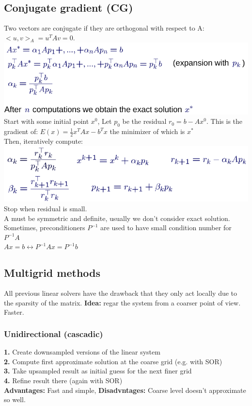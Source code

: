 \documentclass{article}
\begin{document}
\subsection{Conjugate gradient (CG)}
Two vectors are conjugate if they are orthogonal with respect to A: $<u,v>_A=u^TAv=0$.\\
\includegraphics[scale=0.3]{34.png}\\
Start with some initial point $x^0$, Let $p_0$ be the residual $r_0=b-Ax^0$. This is the gradient of: $E(x)=\frac{1}{2}x^TAx-b^Tx$ the minimizer of which is $x^*$\\
Then, iteratively compute:\\
\includegraphics[scale=0.3]{35.png}\\
Stop when residual is small.\\
A must be symmetric and definite, usually we don't consider exact solution. Sometimes, preconditioners $P^{-1}$ are used to have small condition number for $P^{-1}A$\\
$Ax = b \leftrightarrow P^{-1}Ax=P^{-1}b$
\subsection{Multigrid methods}
All previous linear solvers have the drawback that they only act locally due to the sparsity of the matrix. \textbf{Idea: }regar the system from a coarser point of view. Faster.
\subsubsection{Unidirectional (cascadic)}
\textbf{1.} Create downsampled versions of the linear system\\
\textbf{2.} Compute first approximate solution at the coarse grid (e.g. with SOR)\\
\textbf{3.} Take upsampled result as initial guess for the next finer grid\\
\textbf{4.} Refine result there (again with SOR)\\
\textbf{Advantages: }Fast and simple, \textbf{Disadvntages: }Coarse level doesn't approximate so well.
\end{document}
